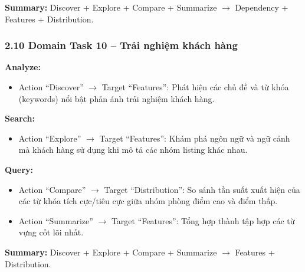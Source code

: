 \textbf{Summary:} Discover + Explore + Compare + Summarize $\rightarrow$ Dependency + Features + Distribution.

\subsubsection*{2.10 Domain Task 10 -- Trải nghiệm khách hàng}

\textbf{Analyze:} 
\begin{itemize}
    \item Action ``Discover'' $\rightarrow$ Target ``Features'': Phát hiện các chủ đề và từ khóa (keywords) nổi bật phản ánh trải nghiệm khách hàng.
\end{itemize}

\textbf{Search:} 
\begin{itemize}
    \item Action ``Explore'' $\rightarrow$ Target ``Features'': Khám phá ngôn ngữ và ngữ cảnh mà khách hàng sử dụng khi mô tả các nhóm listing khác nhau.
\end{itemize}

\textbf{Query:} 
\begin{itemize}
    \item Action ``Compare'' $\rightarrow$ Target ``Distribution'': So sánh tần suất xuất hiện của các từ khóa tích cực/tiêu cực giữa nhóm phòng điểm cao và điểm thấp. 
    \item Action ``Summarize'' $\rightarrow$ Target ``Features'': Tổng hợp thành tập hợp các từ vựng cốt lõi nhất.
\end{itemize}

\textbf{Summary:} Discover + Explore + Compare + Summarize $\rightarrow$ Features + Distribution.
